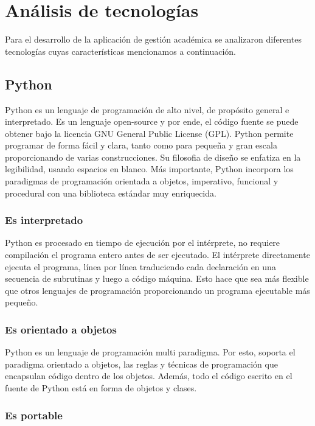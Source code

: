 \chapter{Análisis de tecnologías}
\label{sec:analisis_tecnologias}

Para el desarrollo de la aplicación de gestión académica se analizaron diferentes tecnologías cuyas características mencionamos a continuación.

\section[Python]{Python}

Python es un lenguaje de programación de alto nivel, de propósito general e interpretado. Es un lenguaje open-source y por ende, el código fuente se puede obtener bajo la licencia GNU General Public License (GPL). Python permite programar de forma fácil y clara, tanto como para pequeña y gran escala proporcionando de varias construcciones. Su filosofia de diseño se enfatiza en la legibilidad, usando espacios en blanco. Más importante, Python incorpora los paradigmas de programación orientada a objetos, imperativo, funcional y procedural con una biblioteca estándar muy enriquecida.

\subsection[Es interpretado]{Es interpretado}

Python es procesado en tiempo de ejecución por el intérprete, no requiere compilación el programa entero antes de ser ejecutado. El intérprete directamente ejecuta el programa, línea por línea traduciendo cada declaración en una secuencia de subrutinas y luego a código máquina. Esto hace que sea más flexible que otros lenguajes de programación proporcionando un programa ejecutable más pequeño.

\subsection[Es orientado a objetos]{Es orientado a objetos}

Python es un lenguaje de programación multi paradigma. Por esto, soporta el paradigma orientado a objetos, las reglas y técnicas de programación que encapsulan código dentro de los objetos. Además, todo el código escrito en el fuente de Python está en forma de objetos y clases.

\subsection[Es portable]{Es portable}


